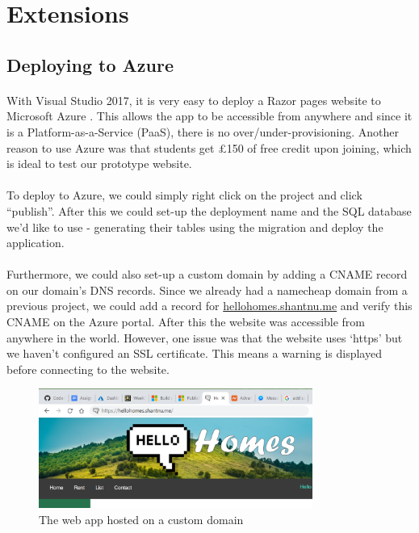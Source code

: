 \documentclass{article}
\begin{document}
\FloatBarrier
\section{Extensions}
    \subsection{Deploying to Azure}
        \paragraph{}
            With Visual Studio 2017, it is very easy to deploy a Razor pages website to Microsoft Azure \cite{azure_tutorial}.
            This allows the app to be accessible from anywhere and since it is a Platform-as-a-Service (PaaS), there is no over/under-provisioning.
            Another reason to use Azure was that students get £150 of free credit upon joining, which is ideal to test our prototype website.

        \paragraph{}
            To deploy to Azure, we could simply right click on the project and click “publish”.
            After this we could set-up the deployment name and the SQL database we’d like to use - generating their tables using the migration and deploy the application.

        \paragraph{}
            Furthermore, we could also set-up a custom domain by adding a CNAME record on our domain’s DNS records.
            Since we already had a namecheap domain from a previous project, we could add a record for \href{https://hellohomes.shantnu.me/}{hellohomes.shantnu.me} and verify this CNAME on the Azure portal.
            After this the website was accessible from anywhere in the world.
            However, one issue was that the website uses ‘https’ but we haven’t configured an SSL certificate.
            This means a warning is displayed before connecting to the website.

            \begin{figure}[!htb]
                \centering
                \includegraphics[width=0.8\textwidth]{figures/custom_domain.png}
                \caption[Custom Domain]{The web app hosted on a custom domain}
                \label{fig:custom_domain}
            \end{figure}
\end{document}
